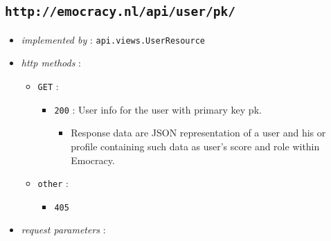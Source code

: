 \documentclass[a4paper]{report}
\begin{document}
\subsection{\texttt{http://emocracy.nl/api/user/\textsf{pk}/}}
\begin{itemize}
    \item{\textsl{implemented by} : \texttt{api.views.UserResource}}
    \item{\textsl{http methods} :
        \begin{itemize}
            \item{\texttt{GET} :
                \begin{itemize}
                    \item{\texttt{200} : User info for the user with primary key \textsf{pk}.
                    \begin{itemize}
                        \item{Response data are JSON representation of a user and
                        his or profile containing such data as user's score
                        and role within Emocracy.}
                    \end{itemize}
                    }
                \end{itemize}
            }
            \item{\texttt{other} :
                \begin{itemize}
                    \item{\texttt{405}}
                \end{itemize}
            }
        \end{itemize}
    }
    \item{\textsl{request parameters} : }
\end{itemize}
\end{document}
